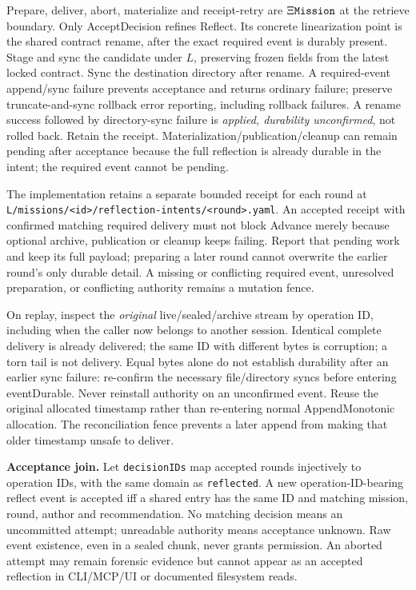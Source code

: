 \documentclass[a4paper,10pt,fleqn]{article}
\newcommand{\fpath}[1]{\nolinkurl{#1}}
\newcommand{\field}[1]{\ifmmode\texttt{#1}\else\texorpdfstring{\breakfield{#1}}{#1}\fi}
\begin{document}
Prepare, deliver, abort, materialize and receipt-retry are
$\Xi\field{Mission}$ at the retrieve boundary. Only AcceptDecision
refines Reflect. Its concrete linearization point is the shared
contract rename, after the exact required event is durably present.
Stage and sync the candidate under $L$, preserving frozen fields from
the latest locked contract. Sync the destination directory after
rename. A required-event append/sync failure prevents acceptance and
returns ordinary failure; preserve truncate-and-sync rollback error
reporting, including rollback failures. A rename success followed by
directory-sync failure is \emph{applied, durability unconfirmed}, not
rolled back. Retain the receipt. Materialization/publication/cleanup
can remain pending after acceptance because the full reflection is
already durable in the intent; the required event cannot be pending.

The implementation retains a separate bounded receipt for each round at
\fpath{L/missions/<id>/reflection-intents/<round>.yaml}. An accepted
receipt with confirmed matching required delivery must not block Advance
merely because optional archive, publication or cleanup keeps failing.
Report that pending work and keep its full payload; preparing a later
round cannot overwrite the earlier round's only durable detail. A
missing or conflicting required event, unresolved preparation, or
conflicting authority remains a mutation fence.

On replay, inspect the \emph{original} live/sealed/archive stream by
operation ID, including when the caller now belongs to another
session. Identical complete delivery is already delivered; the same
ID with different bytes is corruption; a torn tail is not delivery.
Equal bytes alone do not establish durability after an earlier sync
failure: re-confirm the necessary file/directory syncs before entering
eventDurable. Never reinstall authority on an unconfirmed event.
Reuse the original allocated timestamp rather than re-entering normal
AppendMonotonic allocation. The reconciliation fence prevents a later
append from making that older timestamp unsafe to deliver.

\textbf{Acceptance join.} Let \field{decisionIDs} map accepted rounds
injectively to operation IDs, with the same domain as \field{reflected}.
A new operation-ID-bearing reflect event is accepted iff a shared
entry has the same ID and matching mission, round, author and
recommendation. No matching decision means an uncommitted attempt;
unreadable authority means acceptance unknown. Raw event existence,
even in a sealed chunk, never grants permission. An aborted attempt
may remain forensic evidence but cannot appear as an accepted
reflection in CLI/MCP/UI or documented filesystem reads.
\end{document}
